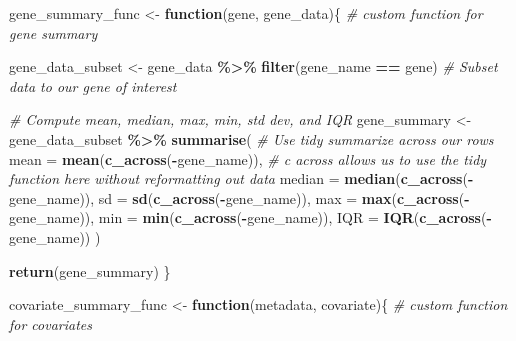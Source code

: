 \documentclass[
]{article}
\newenvironment{Shaded}{\begin{snugshade}}{\end{snugshade}}
\newcommand{\AttributeTok}[1]{\textcolor[rgb]{0.13,0.29,0.53}{#1}}
\newcommand{\CommentTok}[1]{\textcolor[rgb]{0.56,0.35,0.01}{\textit{#1}}}
\newcommand{\ControlFlowTok}[1]{\textcolor[rgb]{0.13,0.29,0.53}{\textbf{#1}}}
\newcommand{\FunctionTok}[1]{\textcolor[rgb]{0.13,0.29,0.53}{\textbf{#1}}}
\newcommand{\NormalTok}[1]{#1}
\newcommand{\OtherTok}[1]{\textcolor[rgb]{0.56,0.35,0.01}{#1}}
\newcommand{\SpecialCharTok}[1]{\textcolor[rgb]{0.81,0.36,0.00}{\textbf{#1}}}
\begin{document}
\begin{Shaded}
\begin{Highlighting}[]
\NormalTok{gene\_summary\_func }\OtherTok{\textless{}{-}} \ControlFlowTok{function}\NormalTok{(gene, gene\_data)\{ }\CommentTok{\# custom function for gene summary}
  
\NormalTok{  gene\_data\_subset }\OtherTok{\textless{}{-}}\NormalTok{ gene\_data }\SpecialCharTok{\%\textgreater{}\%}
    \FunctionTok{filter}\NormalTok{(gene\_name }\SpecialCharTok{==}\NormalTok{ gene) }\CommentTok{\# Subset data to our gene of interest}
  
  \CommentTok{\# Compute mean, median, max, min, std dev, and IQR}
\NormalTok{  gene\_summary }\OtherTok{\textless{}{-}}\NormalTok{ gene\_data\_subset }\SpecialCharTok{\%\textgreater{}\%}
   \FunctionTok{summarise}\NormalTok{( }\CommentTok{\# Use tidy summarize across our rows}
    \AttributeTok{mean =} \FunctionTok{mean}\NormalTok{(}\FunctionTok{c\_across}\NormalTok{(}\SpecialCharTok{{-}}\NormalTok{gene\_name)), }\CommentTok{\# c across allows us to use the tidy function here without reformatting out data}
    \AttributeTok{median =} \FunctionTok{median}\NormalTok{(}\FunctionTok{c\_across}\NormalTok{(}\SpecialCharTok{{-}}\NormalTok{gene\_name)),}
    \AttributeTok{sd =} \FunctionTok{sd}\NormalTok{(}\FunctionTok{c\_across}\NormalTok{(}\SpecialCharTok{{-}}\NormalTok{gene\_name)),}
    \AttributeTok{max =} \FunctionTok{max}\NormalTok{(}\FunctionTok{c\_across}\NormalTok{(}\SpecialCharTok{{-}}\NormalTok{gene\_name)),}
    \AttributeTok{min =} \FunctionTok{min}\NormalTok{(}\FunctionTok{c\_across}\NormalTok{(}\SpecialCharTok{{-}}\NormalTok{gene\_name)),}
    \AttributeTok{IQR =} \FunctionTok{IQR}\NormalTok{(}\FunctionTok{c\_across}\NormalTok{(}\SpecialCharTok{{-}}\NormalTok{gene\_name))}
\NormalTok{  )}
  
  \FunctionTok{return}\NormalTok{(gene\_summary)}
\NormalTok{\}}

\NormalTok{covariate\_summary\_func }\OtherTok{\textless{}{-}} \ControlFlowTok{function}\NormalTok{(metadata, covariate)\{ }\CommentTok{\# custom function for covariates}
  

\end{Highlighting}
\end{Shaded}
\end{document}
